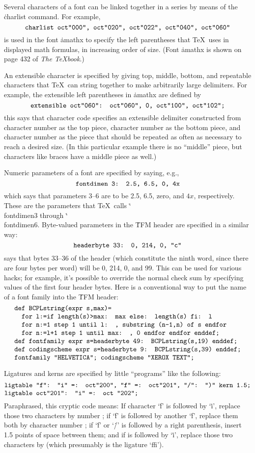 Several characters of a font can be linked together in a series by
means of the \.{charlist} command. For example,
$$\.{charlist oct"000", oct"020", oct"022", oct"040", oct"060"}$$
is used in the font \.{amathx} to specify the left parentheses that
\TeX\ uses in displayed math formulas, in increasing order of size.
(Font \.{amathx} is shown on page 432 of {\sl The \TeX book}.)

An extensible character is specified by giving top, middle, bottom,
and repeatable characters that \TeX\ can string together to make
arbitrarily large delimiters. For example, the extensible left
parentheses in \.{amathx} are defined by
$$\.{extensible oct"060": oct"060", 0, oct"100", oct"102";}$$
this says that character code  specifies an extensible
delimiter constructed from character number  as the top piece,
character number  as the bottom piece, and character number
 as the piece that should be repeated as often as necessary to
reach a desired size. (In this particular example there is no ``middle''
piece, but characters like braces have a middle piece as well.)

Numeric parameters of a font are specified by saying, e.g.,
$$\.{fontdimen 3: 2.5, 6.5, 0, 4x}$$
which says that parameters 3--6 are to be 2.5, 6.5, zero, and $4x$,
respectively. These are the parameters that \TeX\ calls
\.{\char`\\fontdimen3} through \.{\char`\\fontdimen6}. Byte-valued
parameters in the \.{TFM} header are specified in a similar
way:
$$\.{headerbyte 33: 0, 214, 0, "c"}$$
says that bytes 33--36 of the header (which constitute the ninth
word, since there are four bytes per word) will be 0, 214, 0, and 99.
This can be used for various hacks; for example, it's possible to
override the normal check sum by specifying values of the first four
header bytes. Here is a conventional way to put the name of a font
family into the \.{TFM} header:
$$\vcenter{\halign{\tt#\hfil\cr
def BCPLstring(expr s,max)=\cr
\ \ for l:=if length(s)>max: max else: length(s) fi: l\cr
\ \ for n:=1 step 1 until l: , substring (n-1,n) of s endfor\cr
\ \ for n:=l+1 step 1 until max: , 0 endfor endfor enddef;\cr
def fontfamily expr s=headerbyte 49: BCPLstring(s,19) enddef;\cr
def codingscheme expr s=headerbyte 9: BCPLstring(s,39) enddef;\cr
fontfamily "HELVETICA"; codingscheme "XEROX TEXT";\cr}}$$

Ligatures and kerns are specified by little ``programs'' like the
following:
$$\vcenter{\halign{\tt#\hfil\cr
ligtable "f": "i" =: oct"200", "f" =: oct"201", "/": ")" kern 1.5;\cr
ligtable oct"201": "i" =: oct "202";\cr}}$$
Paraphrased, this cryptic code means:
If character `\.f' is followed by `\.i', replace those two
characters by number ; if `\.f' is followed by another `\.f',
replace them both by character number ; if `\.f' or `\./' is
followed by a right parenthesis, insert 1.5 points of space between them;
and if  is followed by `\.i', replace those two characters by
 (which presumably is the ligature `ffi').

